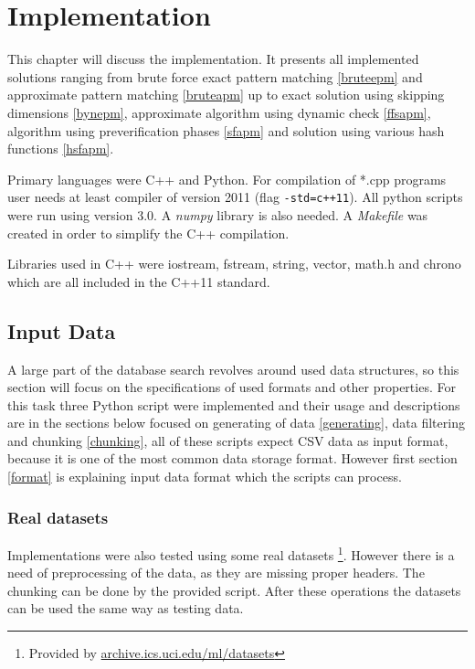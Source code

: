\chapter{Implementation} \label{implementation}
This chapter will discuss the implementation. It presents all implemented solutions ranging from brute force exact pattern matching \ref{bruteepm} and approximate pattern matching \ref{bruteapm} up to exact solution using skipping dimensions \ref{bynepm}, approximate algorithm using dynamic check \ref{ffsapm}, algorithm using preverification phases \ref{sfapm} and solution using various hash functions \ref{hsfapm}.

Primary languages were C++ and Python. For compilation of *.cpp programs user needs at least compiler of version 2011 (flag \texttt{-std=c++11}). All python scripts were run using version 3.0. A \textit{numpy} library is also needed. A \textit{Makefile} was created in order to simplify the C++ compilation.

Libraries used in C++ were iostream, fstream, string, vector, math.h and chrono which are all included in the C++11 standard.

\section{Input Data}
A large part of the database search revolves around used data structures, so this section will focus on the specifications of used formats and other properties. For this task three Python script were implemented and their usage and descriptions are in the sections below focused on generating of data \ref{generating}, data filtering and chunking \ref{chunking}, all of these scripts expect CSV data as input format, because it is one of the most common data storage format. However first section \ref{format} is explaining input data format which the scripts can process.

\subsection{Real datasets}
Implementations were also tested using some real datasets \footnote{Provided by \url{archive.ics.uci.edu/ml/datasets}}. However there is a need of preprocessing of the data, as they are missing proper headers. The chunking can be done by the provided script. After these operations the datasets can be used the same way as testing data.

